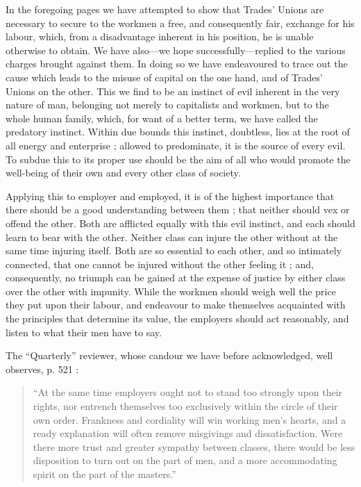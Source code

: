 In the foregoing pages we have attempted to show that Trades'
Unions are necessary to secure to the workmen a free, and consequently
fair, exchange for his labour, which, from a disadvantage inherent in
his position, he is unable otherwise to obtain. We have also---we hope
successfully---replied to the various charges brought against them. In
doing so we have endeavoured to trace out the cause which leads to the
misuse of capital on the one hand, and of Trades' Unions on the other.
This we find to be an instinct of evil inherent in the very nature of
man, belonging not merely to capitalists and workmen, but to the whole
human family, which, for want of a better term, we have called the
predatory instinct. Within due bounds this instinct, doubtless, lies at
the root of all energy and enterprise ; allowed to predominate, it is
the source of every evil. To subdue this to its proper use should be the
aim of all who would promote the well-being of their own and every other
class of society.

Applying this to employer and employed, it is of the highest importance
that there should be a good understanding between them ; that neither
should vex or offend the other. Both are afflicted equally with this
evil instinct, and each should learn to bear with the other. Neither
class can injure the other without at the same time injuring itself.
Both are so essential to each other, and so intimately connected, that
one cannot be injured without the other feeling it ; and, consequently,
no triumph can be gained at the expense of justice by either class over
the other with impunity. While the workmen should weigh well the price
they put upon their labour, and endeavour to make themselves acquainted
with the principles that determine its value, the employers should act
reasonably, and listen to what their men have to say.

The ``Quarterly'' reviewer, whose candour we have before acknowledged,
well observes, p. 521 :

\begin{quote}
``At the same time employers ought not to stand too strongly upon their
rights, nor entrench themselves too exclusively within the circle of
their own order. Frankness and cordiality will win working men's hearts,
and a ready explanation will often remove misgivings and dissatisfaction.
Were there more trust and greater sympathy between classes, there would
be less disposition to turn out on the part of men, and a more
accommodating spirit on the part of the masters.''
\end{quote}

